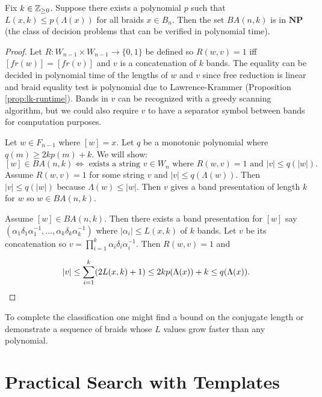 \documentclass[12pt]{thesis}
\begin{document}
\begin{theorem}
    Fix $k \in \mathbb{Z}_{\geq 0}$.
    Suppose there exists a polynomial $p$ such that 
    $L(x, k) \leq p(\Lambda(x))$ for all braids $x \in B_{n}$.
    Then the set $BA(n, k)$ is in $\textbf{NP}$ (the class of decision problems that can be verified in polynomial time).
\end{theorem}

\begin{proof}
    Let $R \colon W_{n-1} \times W_{n-1} \rightarrow \{ 0, 1\}$ be defined
    so  $R(w, v) = 1$ iff $[fr(w)] = [fr(v)]$ and $v$ is a concatenation of $k$ bands.
    The equality can be decided in polynomial time of the lengths of $w$ and $v$
    since free reduction is linear and
    braid equality test is polynomial due to Lawrence-Krammer (Proposition \ref{prop:lk-runtime}).
    Bands in $v$ can be recognized
    with a greedy scanning algorithm, but we could also require $v$ to 
    have a separator symbol between bands for computation purposes.

    Let $w \in F_{n-1}$ where $[w] = x$.
    Let $q$ be a monotonic polynomial where $q(m) \geq 2kp(m) + k$.
    We will show:
    \[
        [w] \in BA(n, k) \Leftrightarrow \text{ exists a string $v \in W_{n}$ where $R(w, v) = 1$ and $|v| \leq q(|w|)$}.
    \]
    Assume $R(w, v) = 1$ for some string $v$ and $|v| \leq q(\Lambda(w))$.
    Then $|v| \leq q(|w|)$ because $\Lambda(w) \leq |w|$.
    Then $v$ gives a band presentation of length $k$ for $w$ so $w \in BA(n, k)$. 

    \begin{sloppypar}
    Assume $[w] \in BA(n, k)$.
    Then there exists a band presentation for $[w]$
    say
     $(\alpha_{1} \delta_{1} \alpha_{1}^{-1},
    \ldots, \alpha_{k} \delta_{k} \alpha_{k}^{-1})$
    where $|\alpha_{i}| \leq L(x, k)$ of $k$ bands.
    Let $v$ be its concatenation so $v = \prod_{i=1}^{k} \alpha_{i}\delta_{i}\alpha_{i}^{-1}$.
    Then $R(w, v) = 1$ and
    \end{sloppypar}
    \[
        |v| \leq \sum_{i=1}^{k} (2L(x, k) + 1) \leq  2kp(\Lambda(x)) + k \leq q(\Lambda(x)). \qedhere 
    \] 
\end{proof}

To complete the classification one might find a bound on the conjugate length
or demonstrate a sequence of braids
whose $L$ values grow faster than any polynomial.

\chapter{Practical Search with Templates}
\end{document}
